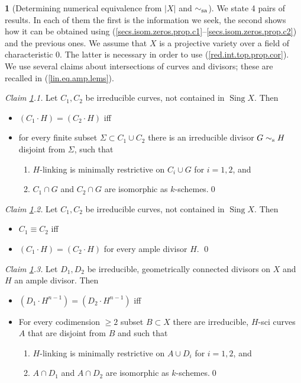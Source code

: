 \documentclass{amsart}
\theoremstyle{definition}
\newtheorem{say}[thm]{}
\theoremstyle{remark}
\newcommand{\sing}[0]{\operatorname{Sing}}
\newcommand{\sims}[0]{\sim_{\rm s}}
\newcommand{\simsa}[0]{\sim_{\rm sa}}
\begin{document}
\begin{say}[Determining numerical equivalence from $|X|$ and $\simsa$]
\label{num.eq.top.say}
We state 4 pairs of results. In each of them the first is the information we seek, the second shows how it can be obtained using 
(\ref{secs.isom.zeros.prop.c1}--\ref{secs.isom.zeros.prop.c2}) and the previous ones.  We assume that  $X$ is a projective variety over a field
of characteristic 0. The latter is necessary in order to use
(\ref{red.int.top.prop.cor}). 
We use several  claims about intersections of curves and divisors; these are recalled in (\ref{lin.eq.amp.lems}). 

\medskip
{\it Claim \ref{num.eq.top.say}.1.}
Let  $C_1, C_2$ be irreducible curves, not contained in $\sing X$.  Then  
\begin{itemize}
\item  $(C_1\cdot H)=(C_2\cdot H)$  iff
\item  for every finite subset $\Sigma\subset C_1\cup C_2$ 
there is  an  irreducible divisor
$G\sims H$ disjoint from $\Sigma$, such that 
\begin{enumerate}
\item[(a)]   $H$-linking is minimally restrictive on $C_i\cup G$  for $i=1,2$, and
\item[(b)] $C_1\cap G$ and $C_2\cap G$ are isomorphic as $k$-schemes.\qed
\end{enumerate}
\end{itemize}


\medskip
{\it Claim \ref{num.eq.top.say}.2.}
 Let  $C_1, C_2$ be irreducible curves, not contained in $\sing X$. Then  
\begin{itemize}
\item  $C_1\equiv C_2$ iff
\item   $(C_1\cdot H)=(C_2\cdot H)$  for every ample  divisor $H$. \qed
\end{itemize}



\medskip
{\it Claim \ref{num.eq.top.say}.3.}
Let  $D_1, D_2$ be irreducible, geometrically connected  divisors on $X$ and $H$ an ample divisor. 
Then  
\begin{itemize}
\item  $(D_1\cdot H^{n-1}) = (D_2\cdot H^{n-1})$ iff 
\item  For every  codimension $\geq 2$ subset $B\subset X$ 
there are irreducible,   $H$-sci  curves $A$  that are disjoint from $B$ and such that
\begin{enumerate}
\item[(a)]   $H$-linking is minimally restrictive on $A\cup D_i$   for $i=1,2$, and
\item[(b)] $A\cap D_1$ and $A\cap D_2$ are isomorphic as $k$-schemes.\qed
\end{enumerate}
\end{itemize}



\end{say}
\end{document}
